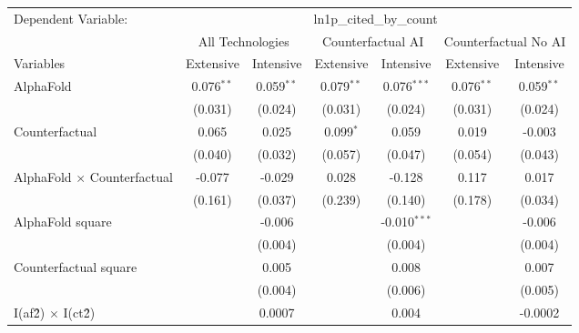 \begingroup
\centering
\begin{tabular}{lcccccc}
   \tabularnewline \midrule \midrule
   Dependent Variable: & \multicolumn{6}{c}{ln1p\_cited\_by\_count}\\
 & \multicolumn{2}{c}{All Technologies} & \multicolumn{2}{c}{Counterfactual AI} & \multicolumn{2}{c}{Counterfactual No AI} \\
\cmidrule(lr){1-1}\cmidrule(lr){2-3} \cmidrule(lr){4-5} \cmidrule(lr){6-7}
Variables & \multicolumn{1}{c}{Extensive} & \multicolumn{1}{c}{Intensive} & \multicolumn{1}{c}{Extensive} & \multicolumn{1}{c}{Intensive} & \multicolumn{1}{c}{Extensive} & \multicolumn{1}{c}{Intensive} \\
\cmidrule(lr){1-1}\cmidrule(lr){2-2} \cmidrule(lr){3-3} \cmidrule(lr){4-4} \cmidrule(lr){5-5} \cmidrule(lr){6-6} \cmidrule(lr){7-7}
   AlphaFold                          & 0.076$^{**}$ & 0.059$^{**}$ & 0.079$^{**}$ & 0.076$^{***}$  & 0.076$^{**}$ & 0.059$^{**}$\\   
                                      & (0.031)      & (0.024)      & (0.031)      & (0.024)        & (0.031)      & (0.024)\\   
   Counterfactual                     & 0.065        & 0.025        & 0.099$^{*}$  & 0.059          & 0.019        & -0.003\\   
                                      & (0.040)      & (0.032)      & (0.057)      & (0.047)        & (0.054)      & (0.043)\\   
   AlphaFold $\times$ Counterfactual  & -0.077       & -0.029       & 0.028        & -0.128         & 0.117        & 0.017\\   
                                      & (0.161)      & (0.037)      & (0.239)      & (0.140)        & (0.178)      & (0.034)\\   
   AlphaFold square                   &              & -0.006       &              & -0.010$^{***}$ &              & -0.006\\   
                                      &              & (0.004)      &              & (0.004)        &              & (0.004)\\   
   Counterfactual square              &              & 0.005        &              & 0.008          &              & 0.007\\   
                                      &              & (0.004)      &              & (0.006)        &              & (0.005)\\   
   I(af\^2) $\times$ I(ct\^2)         &              & 0.0007       &              & 0.004          &              & -0.0002\\   

\end{tabular}
